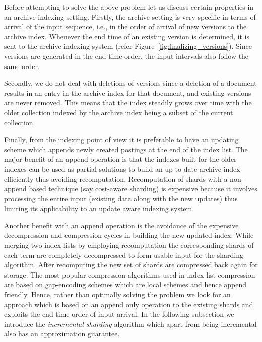 Before attempting to solve the above problem let us discuss certain properties in an archive indexing setting. Firstly, the archive setting is very specific in terms of arrival of the input sequence, i.e., in the order of arrival of new versions to the archive index. Whenever the end time of an existing version is determined, it is sent to the archive indexing system (refer Figure~\ref{fig:finalizing_versions}). Since versions are generated in the end time order, the input intervals also follow the same order. 

Secondly, we do not deal with deletions of versions since a deletion of a document results in an entry in the archive index for that document, and existing versions are never removed. This means that the index steadily grows over time with the older collection indexed by the archive index being a subset of the current collection. 

Finally, from the indexing point of view it is preferable to have an updating scheme which appends newly created postings at the end of the index list. The major benefit of an append operation is that the indexes built for the older indexes can be used as partial solutions to build an up-to-date archive index efficiently thus avoiding recomputation. Recomputation of shards with a non-append based technique (say cost-aware sharding) is expensive because it involves processing the entire input (existing data along with the new updates) thus limiting its applicability to an update aware indexing system. 

Another benefit with an append operation is the avoidance of the expensive decompression and compression cycles in building the new updated index. While merging two index lists by employing recomputation the corresponding shards of each term are completely decompressed to form usable input for the sharding algorithm. After recomputing the new set of shards are compressed back again for storage. The most popular compression algorithms used in index list compression are based on gap-encoding schemes which are local schemes and hence append friendly. Hence, rather than optimally solving the problem we look for an approach which is based on an append only operation to the existing shards and exploits the end time order of input arrival. In the following subsection we introduce the \emph{incremental sharding} algorithm which apart from being incremental also has an approximation guarantee. 

